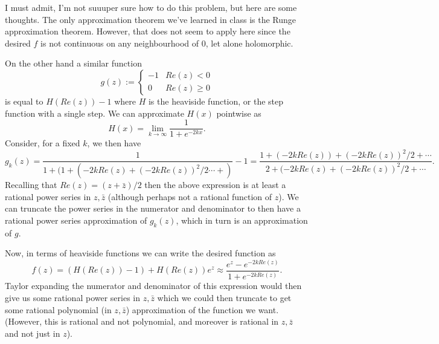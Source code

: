 \documentclass[12pt,letterpaper,boxed]{hmcpset}
\begin{document}
\begin{solution}
I must admit, I'm not suuuper sure how to do this problem, but here
are some thoughts. The only approximation theorem we've learned in
class is the Runge approximation theorem. However, that does not seem
to apply here since the desired $f$ is not continuous on any
neighbourhood of $0$, let alone holomorphic.

On the other hand a similar function \[
	g(z) := \begin{cases}
		-1 & Re(z) < 0  \\
		0 & Re(z) \geq 0
	\end{cases}
\]
is equal to $H(Re(z)) -1$ where $H$ is the heaviside function, or the
step function with a single step. We can approximate $H(x)$ pointwise as \[
	H(x) = \lim_{k \to \infty} \frac{1}{1 + e^{-2kx}}.
\]
Consider, for a fixed $k$, we then have \[
	g_k(z) 
	= \frac{1}{1 + (1 + (-2kRe(z) + (-2kRe(z))^2/2 \cdots + )} - 1 
= \frac{1 + (-2kRe(z)) + (-2kRe(z))^2/2  + \cdots}{2 + (-2kRe(z) +
(-2kRe(z))^2/2 + \cdots}.
\]
Recalling that $Re(z) = (z + \bar z)/2$ then the above expression is
at least a rational power series in $z, \bar z$ (although perhaps not
a rational function of $z$). We can truncate the power series in the
numerator and denominator to then have a rational power series
approximation of $g_k(z)$, which in turn is an approximation of $g$. 

Now, in terms of heaviside functions we can write the desired function
as \[
f(z) = (H(Re(z)) - 1) + H(Re(z))e^z \approx \frac{e^z -
e^{-2kRe(z)}}{1 + e^{-2kRe(z)}}. 
\]
Taylor expanding the numerator and denominator of this expression
would then give us some rational power series in $z, \bar z$ which we
could then truncate to get some rational polynomial (in $z, \bar z$)
approximation of the function we want. (However, this is rational and
not polynomial, and moreover is rational in $z, \bar z$ and not just
in $z$).
\end{solution}

\newpage
\end{document}
